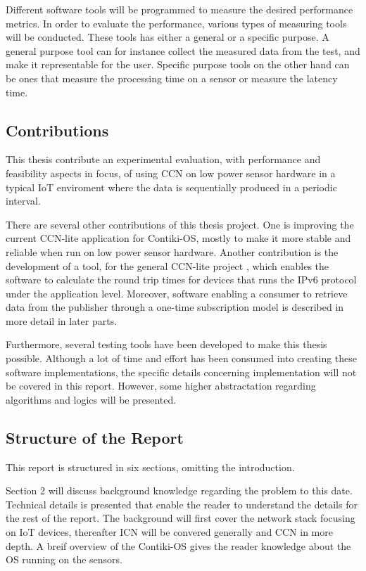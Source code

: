 Different software tools will be programmed to measure the desired performance metrics. 
In order to evaluate the performance, various types of measuring tools will be conducted. These tools has either a general or a specific purpose. A general purpose tool can for instance collect the measured data from the test, and make it representable for the user. Specific purpose tools on the other hand can be ones that measure the processing time on a sensor or measure the latency time. 

\subsection{Contributions}

This thesis contribute an experimental evaluation, with performance and feasibility aspects in focus, of using CCN on low power sensor hardware in a typical IoT enviroment where the data is sequentially produced in a periodic interval.

There are several other contributions of this thesis project. One is improving the current CCN-lite application for Contiki-OS, mostly to make it more stable and reliable when run on low power sensor hardware. Another contribution is the development of a tool, for the general CCN-lite project \cite{CCN-LITE}, which enables the software to calculate the round trip times for devices that runs the IPv6 protocol under the application level. Moreover, software enabling a consumer to retrieve data from the publisher through a one-time subscription model is described in more detail in later parts.

Furthermore, several testing tools have been developed to make this thesis possible. Although a lot of time and effort has been consumed into creating these software implementations, the specific details concerning implementation will not be covered in this report. However, some higher abstractation regarding algorithms and logics will be presented.



\newpage
\subsection{Structure of the Report}
This report is structured in six sections, omitting the introduction.

Section 2 will discuss background knowledge regarding the problem to this date. Technical details is presented that enable the reader to understand the details for the rest of the report. The background will first cover the network stack focusing on IoT devices, thereafter ICN will be convered generally and CCN in more depth. A breif overview of the Contiki-OS gives the reader knowledge about the OS running on the sensors.

